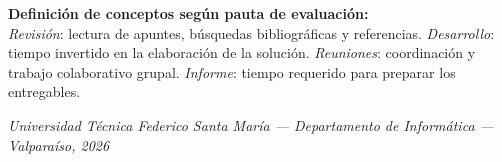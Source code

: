 \vspace{-0.5em}

\noindent
{\footnotesize
\textbf{Definición de conceptos según pauta de evaluación:}\\
\textit{Revisión}: lectura de apuntes, búsquedas bibliográficas y referencias.
\textit{Desarrollo}: tiempo invertido en la elaboración de la solución.
\textit{Reuniones}: coordinación y trabajo colaborativo grupal.
\textit{Informe}: tiempo requerido para preparar los entregables.
}

\vfill

\begin{center}
{\footnotesize \textit{
Universidad Técnica Federico Santa María ---
Departamento de Informática ---
Valparaíso, 2026
}}
\end{center}

\newpage
